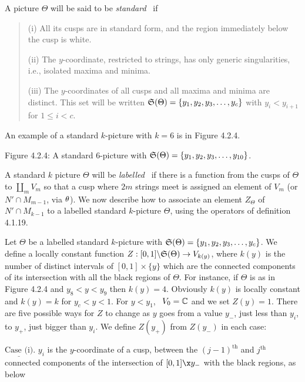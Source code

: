 A picture $\Theta$ will be said to be {\it standard} \ if
\begin{verse}
(i) All its cusps are in standard form, and the region
immediately below the cusp is white.

(ii) The $y$-coordinate, restricted to strings, has only
generic singularities, i.e., isolated maxima and minima.

(iii) The $y$-coordinates of all cusps and  all maxima and
minima are distinct. This set will be written
$\frak S(\Theta)=\{ y_1,y_2,y_3,\dots ,y_c\}$ with
$y_i < y_{i+1}$ for $1\leq i < c$.
\end{verse}

\ni An example of a standard $k$-picture with $k=6$ is in Figure
4.2.4.
\[
	
\]
\begin{center}
	Figure 4.2.4:  A standard 6-picture with
$\frak S(\Theta)=\{ y_1,y_2,y_3,\dots ,y_{10}\}$.
\end{center}
\bs
A standard $k$ picture $\Theta$ will be {\it labelled} \ if there is a
function from the cusps of $\Theta$ to $\coprod_m V_m$ so that a
cusp where $2m$ strings meet is assigned an element of
$V_m$ (or $N'\cap M_{m-1}$, via $\theta$). We now describe  how to
associate an element $Z_{\Theta}$ of $N'\cap M_{k-1}$ to a
labelled standard $k$-picture $\Theta$, using the operators of
definition 4.1.19.

Let $\Theta$ be a labelled standard $k$-picture with
$\frak S(\Theta)=\{ y_1,y_2,y_3,\dots ,y_c\}$. We define a locally
constant function $Z:[0,1]\backslash\frak S(\Theta)\to V_{k(y)}$,
where $k(y)$ is the number  of distinct intervals of
$[0,1]\times \{y\}$ which are the connected components of its
intersection with all the black regions of $\Theta$. For instance, if
$\Theta$ is as in Figure 4.2.4 and $y_8 < y < y_9$ then $k(y)=4$.
Obviously $k(y)$ is locally constant and $k(y)=k$ for $y_c < y < 1$.
For $y < y_1$, \ $V_0=\Bbb C$ and we set $Z(y)=1$. There are five
possible ways for $Z$ to change as $y$ goes from a value $y_-$,
just less than $y_i$, to $y_+$, just bigger than $y_i$. We define
$Z(y_+)$ from $Z(y_-)$ in each case:

\medskip${\underline{\mbox{Case (i)}}}$. $y_i$ is the
$y$-coordinate of a cusp, between the $(j-1)^{\text{th}}$ and
$j^{\text{th}}$ connected components of the intersection of
$[0,1]\x y_-$ with the black regions, as below
\[
	
\]


